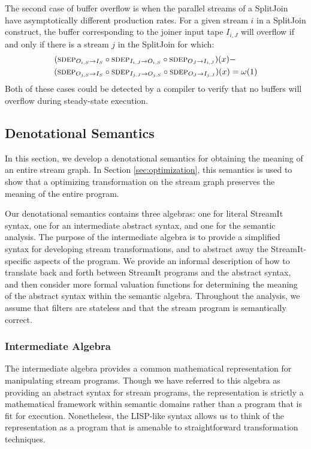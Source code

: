 The second case of buffer overflow is when the parallel streams of a
SplitJoin have asymptotically different production rates.  For a given
stream $i$ in a SplitJoin construct, the buffer corresponding to the
joiner input tape $I_{i,J}$ will overflow if and only if there is a
stream $j$ in the SplitJoin for which:
\begin{align*}
(\mi{I_S}{O_{i,S}}& \circ \mi{O_{i,S}}{I_{i,J}} \circ \mi{I_{i,J}}{O_J})(x) - \\
(\mi{I_S}{O_{j,S}}& \circ \mi{O_{j,S}}{I_{j,J}} \circ \mi{I_{j,J}}{O_J})(x) = \omega(1)
\end{align*}
Both of these cases could be detected by a compiler to verify that no
buffers will overflow during steady-state execution.

\subsection{Denotational Semantics}
\label{sec:denotational}

In this section, we develop a denotational semantics for obtaining the
meaning of an entire stream graph.  In Section \ref{sec:optimization},
this semantics is used to show that a optimizing transformation on the
stream graph preserves the meaning of the entire program.

Our denotational semantics contains three algebras: one for literal
StreamIt syntax, one for an intermediate abstract syntax, and one for
the semantic analysis.  The purpose of the intermediate algebra is to
provide a simplified syntax for developing stream transformations, and
to abstract away the StreamIt-specific aspects of the program.  We
provide an informal description of how to translate back and forth
between StreamIt programs and the abstract syntax, and then consider
more formal valuation functions for determining the meaning of the
abstract syntax within the semantic algebra.  Throughout the analysis,
we assume that filters are stateless and that the stream program is
semantically correct.

\subsubsection{Intermediate Algebra}
\label{sec:intalgebra}

The intermediate algebra provides a common mathematical representation
for manipulating stream programs.  Though we have referred to this
algebra as providing an abstract syntax for stream programs, the
representation is strictly a mathematical framework within semantic
domains rather than a program that is fit for execution.  Nonetheless,
the LISP-like syntax allows us to think of the representation as a
program that is amenable to straightforward transformation techniques.

